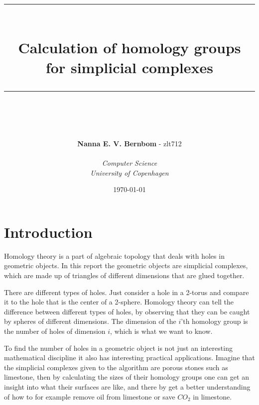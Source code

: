 \documentclass[11pt,a4paper,twoside]{report}
\newcommand{\HRule}{\rule{\linewidth}{0.5mm}}
\begin{document}
\begin{titlepage}
\title{\HRule \\[0.4cm]
\textbf{Calculation of homology groups\\for simplicial complexes}\\
\HRule \\[0.4cm]}
\author{\textbf{Nanna E. V. Bernbom} - zlt712\\\\
\textit{Computer Science}\\
\textit{University of Copenhagen}}
\date{\today}

\maketitle
\thispagestyle{empty}
\end{titlepage}

\newpage
\tableofcontents
\newpage
\section*{Introduction}
Homology theory is a part of algebraic topology that deals with holes in geometric objects. In this report the geometric objects are simplicial complexes, which are made up of triangles of different dimensions that are glued together.

There are different types of holes. Just consider a hole in a 2-torus and compare it to the hole that is the center of a 2-sphere. Homology theory can tell the difference between different types of holes, by observing that they can be caught by spheres of different dimensions. The dimension of the $i$'th homology group is the number of holes of dimension $i$, which is what we want to know.

To find the number of holes in a geometric object is not just an interesting mathematical discipline it also has interesting practical applications. Imagine that the simplicial complexes given to the algorithm are porous stones such as limestone, then by calculating the sizes of their homology groups one can get an insight into what their surfaces are like, and there by get a better understanding of how to for example remove oil from limestone or save $CO_2$ in limestone. 
\newpage
\end{document}
